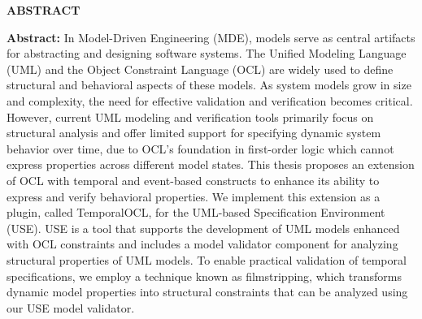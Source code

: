 \begin{center}
  \textbf{\large{ABSTRACT}	}
\end{center}


\begin{small}

\textbf{Abstract:} In Model-Driven Engineering (MDE), models serve as central artifacts 
for abstracting and designing software systems. The Unified Modeling Language (UML) and 
the Object Constraint Language (OCL) are widely used to define structural and behavioral 
aspects of these models. As system models grow in size and complexity, the need for effective 
validation and verification becomes critical. However, current UML modeling and verification tools 
primarily focus on structural analysis and offer limited support for specifying dynamic system 
behavior over time, due to OCL's foundation in first-order logic which cannot express properties across different model states. 
This thesis proposes an extension of OCL with temporal and event-based constructs to enhance its 
ability to express and verify behavioral properties. We implement this extension as a plugin, called 
TemporalOCL, for the UML-based Specification Environment (USE). USE is a tool that supports the 
development of UML models enhanced with OCL constraints and includes a model validator component for 
analyzing structural properties of UML models. To enable practical validation of temporal specifications, 
we employ a technique known as filmstripping, which transforms dynamic model properties into structural 
constraints that can be analyzed using our USE model validator.



\end{small}
